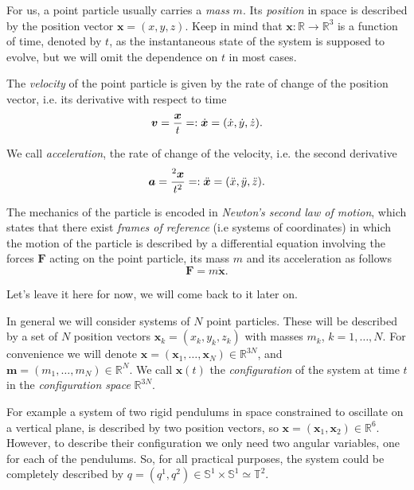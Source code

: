 \documentclass[english,fontsize=11pt,paper=a5,oneside]{scrbook}
\newcommand{\R}{\mathbb{R}}
\newcommand{\T}{\mathbb{T}}
\newcommand{\bS}{\mathbb{S}}
\newcommand{\bx}{\bm{x}}
\newcommand{\bv}{\bm{v}}
\let\d\relax
\DeclareMathOperator{\d}{d}
\newcommand{\der}[2]{\frac{\d{#1}}{\d{#2}}}
\theoremstyle{definition}
\newenvironment{example}
  {\pushQED{\qed}\renewcommand{\qedsymbol}{$\lozenge$}\examplex}
  {\popQED\endexamplex}
\begin{document}
For us, a point particle usually carries a \emph{mass} $m$.
Its \emph{position} in space is described by the position vector $\bx = (x, y ,z)$.
Keep in mind that $\bx : \R\to\R^3$ is a function of time, denoted by $t$, as the instantaneous state of the system is supposed to evolve, but we will omit the dependence on $t$ in most cases. 

The \emph{velocity} of the point particle is given by the rate of change of the position vector, i.e. its derivative with respect to time
\begin{equation}
    \bv = \der{\bx}{t} =: \dot{\bx} = (\dot{x}, \dot{y}, \dot{z}).
\end{equation}

We call \emph{acceleration}, the rate of change of the velocity, i.e. the second derivative
\begin{equation}
    \bm{a} = \der{^2\bx}{t^2} =: \ddot{\bx} = (\ddot{x}, \ddot{y}, \ddot{z}).
\end{equation}

\begin{tcolorbox}
The mechanics of the particle is encoded in \emph{Newton's second law of motion}, which states that there exist \emph{frames of reference} (i.e systems of coordinates) in which the motion of the particle is described by a differential equation involving the forces $\bm{F}$ acting on the point particle, its mass $m$ and its acceleration as follows
\begin{equation}\label{eq:newton}
    \bm F = m \ddot{\bx}.
\end{equation}
\end{tcolorbox}
Let's leave it here for now, we will come back to it later on.
\medskip

In general we will consider systems of $N$ point particles.
These will be described by a set of $N$ position vectors $\bx_k = (x_k, y_k ,z_k)$ with masses $m_k$, $k = 1, \ldots, N$.
For convenience we will denote $\bx = (\bx_1, \ldots, \bx_N)\in\R^{3N}$, and $\bm{m} = (m_1, \ldots, m_N)\in\R^N$.
We call $\bx(t)$ the \emph{configuration} of the system at time $t$ in the \emph{configuration space} $\R^{3N}$.

\begin{example}\label{example:gcoords}
    For example a system of two rigid pendulums in space constrained to oscillate on a vertical plane, is described by two position vectors, so $\bx = (\bx_1, \bx_2)\in\R^{6}$.
    However, to describe their configuration we only need two angular variables, one for each of the pendulums. So, for all practical purposes, the system could be completely described by $q = (q^1, q^2) \in \bS^1\times\bS^1 \simeq \T^2$.
\end{example}
\end{document}

